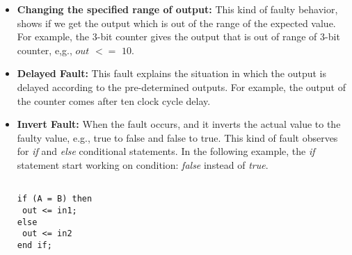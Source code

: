 \begin{itemize}
\begin{table}[tb!]
\label{FMFIRA}
\end{table}

\item \textbf{Changing the specified range of output:} This kind of faulty behavior, shows if we get the output which is out of the range of the expected value. For example, the 3-bit counter gives the output that is out of range of 3-bit counter, e,g., $out$ $<=$ $10$.

\item \textbf{Delayed Fault:} This fault explains the situation in which the output is delayed according to the pre-determined outputs. For example, the output of the counter comes after ten clock cycle delay.



\item \textbf{Invert Fault:} When the fault occurs, and it inverts the actual value to the faulty value, e.g., true to false and false to true. This kind of fault observes for \textit{if} and \textit{else}
conditional statements. In the following example, the \textit{if} statement start working on condition: \textit{false} instead of \textit{true}.


\begin{lstlisting}[frame=single]  % Start your code-block

if (A = B) then 
 out <= in1;
else
 out <= in2
end if;
\end{lstlisting}


\end{itemize}
